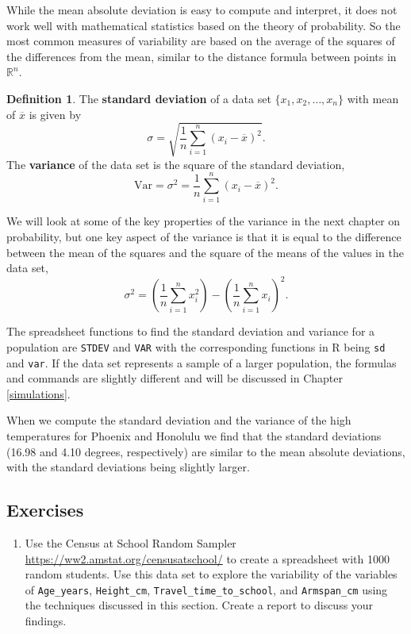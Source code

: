 \documentclass[
]{book}
\providecommand{\tightlist}{%
  \setlength{\itemsep}{0pt}\setlength{\parskip}{0pt}}
\theoremstyle{definition}
\newtheorem{definition}{Definition}[chapter]
\theoremstyle{definition}
\theoremstyle{definition}
\theoremstyle{definition}
\theoremstyle{remark}
\begin{document}
While the mean absolute deviation is easy to compute and interpret, it does not work well with mathematical statistics based on the theory of probability. So the most common measures of variability are based on the average of the squares of the differences from the mean, similar to the distance formula between points in \(\mathbb{R}^n\).

\begin{definition}
The \textbf{standard deviation} of a data set \(\{x_1, x_2, \ldots, x_n\}\) with mean of \(\overline{x}\) is given by \[\sigma =  \sqrt{ \frac{1}{n} \sum_{i=1}^n \left(x_i - \overline{x}\right)^2}.\]
The \textbf{variance} of the data set is the square of the standard deviation,
\[\mathrm{Var} = \sigma^2 = \frac{1}{n} \sum_{i=1}^n \left(x_i - \overline{x}\right)^2.\]
\end{definition}

We will look at some of the key properties of the variance in the next chapter on probability, but one key aspect of the variance is that it is equal to the difference between the mean of the squares and the square of the means of the values in the data set,
\[\sigma^2 = \left(\frac{1}{n} \sum_{i=1}^n x_i^2\right) - \left( \frac{1}{n} \sum_{i=1}^n x_i \right)^2.\]

The spreadsheet functions to find the standard deviation and variance for a population are \texttt{STDEV} and \texttt{VAR} with the corresponding functions in R being \texttt{sd} and \texttt{var}. If the data set represents a sample of a larger population, the formulas and commands are slightly different and will be discussed in Chapter \ref{simulations}.

When we compute the standard deviation and the variance of the high temperatures for Phoenix and Honolulu we find that the standard deviations (16.98 and 4.10 degrees, respectively) are similar to the mean absolute deviations, with the standard deviations being slightly larger.

\hypertarget{exercises-63}{%
\subsection{Exercises}\label{exercises-63}}

\begin{enumerate}
\def\labelenumi{\arabic{enumi}.}
\tightlist
\item
  Use the Census at School Random Sampler \url{https://ww2.amstat.org/censusatschool/} to create a spreadsheet with 1000 random students. Use this data set to explore the variability of the variables of \texttt{Age\_years}, \texttt{Height\_cm}, \texttt{Travel\_time\_to\_school}, and \texttt{Armspan\_cm} using the techniques discussed in this section. Create a report to discuss your findings.
\end{enumerate}
\end{document}
